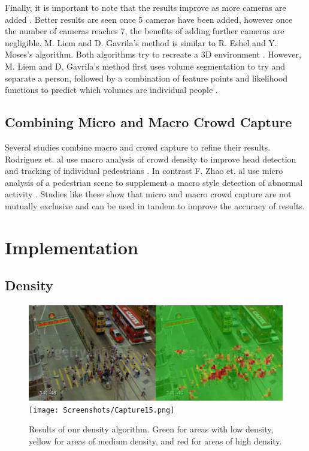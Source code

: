 \documentclass[12pt, onecolumn, conference]{IEEEtran}
\begin{document}
Finally, it is important to note that the results improve as more cameras are added \cite{R. Eshel}. Better results are seen once 5 cameras have been added, however once the number of cameras reaches 7, the benefits of adding further cameras are negligible.
M. Liem and D. Gavrila’s method is similar to R. Eshel and Y. Moses’s algorithm. Both algorithms try to recreate a 3D environment \cite{R. Eshel}\cite{M. Liem}. However, M. Liem and D. Gavrila’s method first uses volume segmentation to try and separate a person, followed by a combination of feature points and likelihood functions to predict which volumes are individual people \cite{M. Liem}.


\subsection{Combining Micro and Macro Crowd Capture}

Several studies combine macro and crowd capture to refine their results. Rodriguez et. al use macro analysis of crowd density to improve head detection and tracking of individual pedestrians \cite{M. Rodriguez}. In contrast F. Zhao et. al use micro analysis of a pedestrian scene to supplement a macro style detection of abnormal activity \cite{D. Zhang}. Studies like these show that micro and macro crowd capture are not mutually exclusive and can be used in tandem to improve the accuracy of results. 

\section{Implementation}

\subsection{Density}

\begin{figure}[!t]
\centering
\includegraphics[width=6in]{Screenshots/Density.png}
\texttt{[image: Screenshots/Capture15.png]}
\caption{Results of our density algorithm. Green for areas with low density, yellow for areas of medium density, and red for areas of high density.}
\label{Density}
\end{figure}
\end{document}
